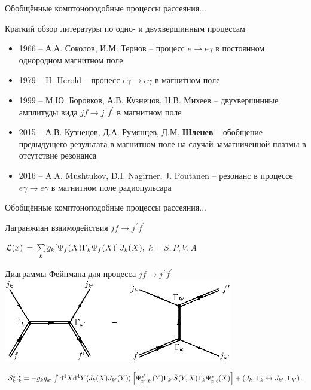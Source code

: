 \documentclass{beamer}
\newcommand{\dd}{\mathrm{d}}
\begin{document}
\begin{frame}{Обобщённые комптоноподобные процессы рассеяния...}
\begin{center}
Краткий обзор литературы по одно- и двухвершинным процессам
\end{center}

\begin{itemize}
\item 1966 -- А.А. Соколов, И.М. Тернов -- процесс $e\to e \gamma$ в постоянном однородном магнитном поле
\item 1979 -- H. Herold -- процесс $e\gamma\to e \gamma$ в магнитном поле
\item 1999 -- М.Ю. Боровков, А.В. Кузнецов, Н.В.  Михеев -- двухвершинные 
амплитуды вида $jf\to j^{\, \prime} f^{\prime}$ в магнитном поле
\item 2015 -- А.В. Кузнецов, Д.А. Румянцев, Д.М. {\bf Шленев} -- обобщение предыдущего результата 
в магнитном поле на случай замагниченной плазмы в отсутствие резонанса
\item 2016 -- A.A. Mushtukov, D.I. Nagirner, J. Poutanen -- резонанс в процессе 
$e\gamma\to e \gamma$ в магнитном поле радиопульсара
\end{itemize}
\end{frame}
\begin{frame}{Обобщённые комптоноподобные процессы рассеяния...}
\begin{center}
Лагранжиан взаимодействия $jf\to j^{\, \prime} f^{\prime}$

${\cal L}(x) \, = \, \sum \limits_{k} g_k 
[\bar {\Psi}_f (X) \Gamma_k \Psi_f(X)]\, J_k(X),$
$k=S, P, V, A$

Диаграммы Фейнмана для процесса $jf\to j^{\, \prime} f^{\prime}$
\includegraphics[width=10cm]{fig1_1.eps}
\end{center}
${\cal S}^{s^{\, \prime} s}_{k^{\, \prime} k} = - g_k g_{k'}\int \dd^4 X \dd^4 Y \langle J_k (X) J_{k'} (Y) \rangle 
\left [\bar \Psi^{s'}_{p',\ell'}(Y) \Gamma_{k'} 
\hat S(Y,X) 
\Gamma_k \Psi^{s}_{p,\ell}(X) \right ] + (J_k, \Gamma_k \leftrightarrow J_{k'}, \Gamma_{k'})\, .$
\end{frame}
\end{document}
